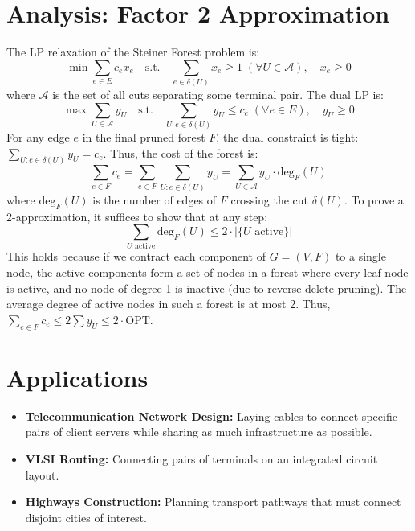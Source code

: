 \documentclass[11pt,oneside]{book}
\begin{document}
\section{Analysis: Factor 2 Approximation}
The LP relaxation of the Steiner Forest problem is:
\[
\min \sum_{e \in E} c_e x_e \quad \text{s.t.} \quad \sum_{e \in \delta(U)} x_e \ge 1 \; (\forall U \in \mathcal{A}), \quad x_e \ge 0
\]
where $\mathcal{A}$ is the set of all cuts separating some terminal pair. The dual LP is:
\[
\max \sum_{U \in \mathcal{A}} y_U \quad \text{s.t.} \quad \sum_{U: e \in \delta(U)} y_U \le c_e \; (\forall e \in E), \quad y_U \ge 0
\]
For any edge $e$ in the final pruned forest $F$, the dual constraint is tight: $\sum_{U: e \in \delta(U)} y_U = c_e$. Thus, the cost of the forest is:
\[
\sum_{e \in F} c_e = \sum_{e \in F} \sum_{U: e \in \delta(U)} y_U = \sum_{U \in \mathcal{A}} y_U \cdot \text{deg}_F(U)
\]
where $\text{deg}_F(U)$ is the number of edges of $F$ crossing the cut $\delta(U)$. To prove a 2-approximation, it suffices to show that at any step:
\[
\sum_{U \text{ active}} \text{deg}_F(U) \le 2 \cdot |\{U \text{ active}\}|
\]
This holds because if we contract each component of $G=(V, F)$ to a single node, the active components form a set of nodes in a forest where every leaf node is active, and no node of degree 1 is inactive (due to reverse-delete pruning). The average degree of active nodes in such a forest is at most 2. Thus, $\sum_{e \in F} c_e \le 2 \sum y_U \le 2 \cdot \text{OPT}$.

\section{Applications}
\begin{itemize}
    \item \textbf{Telecommunication Network Design:} Laying cables to connect specific pairs of client servers while sharing as much infrastructure as possible.
    \item \textbf{VLSI Routing:} Connecting pairs of terminals on an integrated circuit layout.
    \item \textbf{Highways Construction:} Planning transport pathways that must connect disjoint cities of interest.
\end{itemize}
\end{document}

